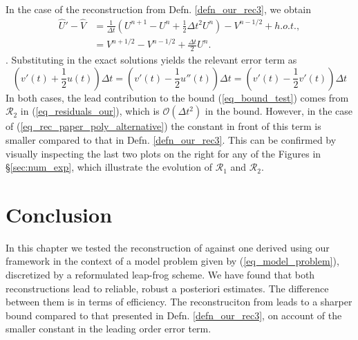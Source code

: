 \documentclass[12pt,a4paper]{article}
\numberwithin{equation}{section}
\theoremstyle{definition}
\newcommand{\qp}[1]{\left(#1\right)}
\newcommand{\rec}[1]{\widehat{{#1}}}
\begin{document}
In the case of the reconstruction from Defn. \ref{defn_our_rec3}, we obtain
\begin{equation*}
\begin{aligned}
\rec{U}'-\rec{V} &=\frac{1}{\Delta t}\qp{U^{n+1}-U^n+\frac{1}{2}\Delta t^2 U^n} -V^{n-1/2}+ h.o.t.,\\
&= V^{n+1/2}-V^{n-1/2}+\frac{\Delta t}{2}U^n.
\end{aligned}
\end{equation*}.
Substituting in the exact solutions yields the relevant error term as 
\begin{equation}
\qp{v'\qp{t}+\frac{1}{2} u\qp{t}}\Delta t=\qp{v'\qp{t}-\frac{1}{2} u''\qp{t}}\Delta t=\qp{v'\qp{t}-\frac{1}{2} v'\qp{t}}\Delta t
\end{equation}
In both cases, the lead contribution to the bound (\ref{eq_bound_test}) comes from $\mathcal{R}_2$ in (\ref{eq_residuals_our}), which is $\mathcal{O}\qp{\Delta t^2}$ in the bound.  However, in the case of (\ref{eq_rec_paper_poly_alternative}) the constant in front of this term is smaller compared to that in Defn. \ref{defn_our_rec3}.  This can be confirmed by visually inspecting the last two plots on the right for any of the Figures in \S \ref{sec:num_exp}, which illustrate the evolution of $\mathcal{R}_1$ and $\mathcal{R}_2$.  

\section{Conclusion}
In this chapter we tested the reconstruction of \cite{georgoulis2016posteriori} against one derived using our framework in the context of a model problem given by (\ref{eq_model_problem}), discretized by a reformulated leap-frog scheme. We have found that both reconstructions lead to reliable, robust a posteriori estimates.  The difference between them is in terms of efficiency.  The reconstruciton from \cite{georgoulis2016posteriori} leads to a sharper bound compared to that presented in Defn. \ref{defn_our_rec3}, on account of the smaller constant in the leading order error term. 



\end{document}
